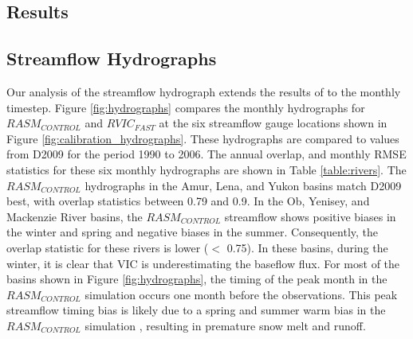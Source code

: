 \documentclass[jgrga, draft]{agutex}
\begin{document}
\begin{article}
\section{Results}
\label{sec:results}

\subsection{Streamflow Hydrographs}
\label{sec:hydrographs}

Our analysis of the streamflow hydrograph extends the results of \citet{Hamman_2016} to the monthly timestep.
Figure \ref{fig:hydrographs} compares the monthly hydrographs for $RASM_{CONTROL}$ and $RVIC_{FAST}$ at the six streamflow gauge locations shown in Figure \ref{fig:calibration_hydrographs}.
These hydrographs are compared to values from D2009 for the period 1990 to 2006.
The annual overlap, and monthly RMSE statistics for these six monthly hydrographs are shown in Table \ref{table:rivers}. %
The $RASM_{CONTROL}$ hydrographs in the Amur, Lena, and Yukon basins match D2009 best, with overlap statistics between 0.79 and 0.9.
In the Ob, Yenisey, and Mackenzie River basins, the $RASM_{CONTROL}$ streamflow shows positive biases in the winter and spring and negative biases in the summer.
Consequently, the overlap statistic for these rivers is lower ($<$ 0.75).
In these basins, during the winter, it is clear that VIC is underestimating the baseflow flux.
For most of the basins shown in Figure \ref{fig:hydrographs}, the timing of the peak month in the $RASM_{CONTROL}$ simulation occurs one month before the observations.
This peak streamflow timing bias is likely due to a spring and summer warm bias in the $RASM_{CONTROL}$ simulation \citep{Hamman_2016,Cassano_2016}, resulting in premature snow melt and runoff.

\end{article}
\end{document}

